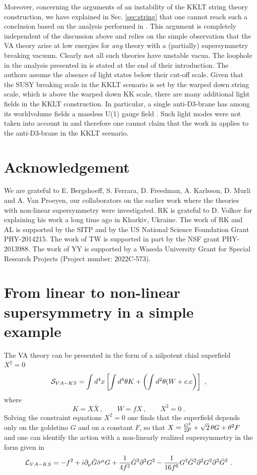 \documentclass[11pt]{article}
\newcommand{\be}{\begin{equation}}
\newcommand{\ee}{\end{equation}}
\def\be{\begin{equation}}
\def\ee{\end{equation}}
\newcommand{\lp}{\left(}
\newcommand{\rp}{\right)}
\newcommand{\ls}{\left[}
\newcommand{\rs}{\right]}
\begin{document}
Moreover, concerning the arguments of an instability of the KKLT string theory construction, we have explained in Sec. \ref{sec:string} that one cannot reach such a conclusion based on the analysis performed in \cite{DallAgata:2022abm}. This argument is completely independent of the discussion above and relies on the simple observation that the VA theory arise at low energies for \emph{any} theory with a (partially) supersymmetry breaking vacuum. Clearly not all such theories have unstable vacua. The loophole in the analysis presented in \cite{DallAgata:2022abm} is stated at the end of their introduction. The authors assume the absence of light states below their cut-off scale. Given that the SUSY breaking scale in the KKLT scenario is set by the warped down string scale, which is above the warped down KK scale, there are many additional light fields in the KKLT construction. In particular, a single anti-D3-brane has among its worldvolume fields a massless U(1) gauge field \cite{Cribiori:2019hod}. Such light modes were not taken into account in \cite{DallAgata:2022abm} and therefore one cannot claim that the work in \cite{DallAgata:2022abm} applies to the anti-D3-brane in the KKLT scenario.

\section*{Acknowledgement}
We are grateful to  E. Bergshoeff, S. Ferrara, D. Freedman,  A. Karlsson, D. Murli and A. Van Proeyen, our collaborators  on the earlier work where the theories with non-linear supersymmetry were investigated. RK is grateful to D. Volkov for explaining his work a long time ago in Kharkiv, Ukraine. The work of RK and AL is  supported by the SITP and by the US National Science Foundation Grant PHY-2014215. The work of TW is supported in part by the NSF grant PHY-2013988. The work of YY is supported by a Waseda University Grant for Special Research Projects (Project number: 2022C-573).



\appendix

\section{From linear to non-linear supersymmetry in a simple example}\label{appA}

The VA theory \cite{Volkov:1973ix} can be presented in the form of a nilpotent chial superfield $X^2=0$ \cite{Komargodski:2009rz} 
\be
 {\cal S}_{VA-KS} = \int d^4 x \ls \int d^4\theta K + \lp\int d^2 \theta (W  + c.c\rp \rs \ ,
\label{VAKS}\ee
where
\be
K= X\bar X\, ,\qquad W= f X\, ,\qquad X^2=0 \ .
\label{KW}\ee
Solving the constraint equations $X^2=0$ one finds that the superfield depends only on the goldstino $G$ and on a constant $F$, so that $X={G^2\over 2F} + \sqrt 2 \,\theta G + \theta^2 F $ and one can identify the action with a non-linearly realized supersymmetry in the form given in  \cite{Komargodski:2009rz} \be
{\cal L}_{VA-KS}=-f^2 +i \partial_\mu  \bar G \bar \sigma^\mu G + {1\over 4 f^2} \bar G^2 \partial^2 G^2 - {1\over 16 f^6} G^2  \bar G^2 \partial^2 G^2 \partial^2 \bar G^2 \ .
\label{VA}\ee
\end{document}
